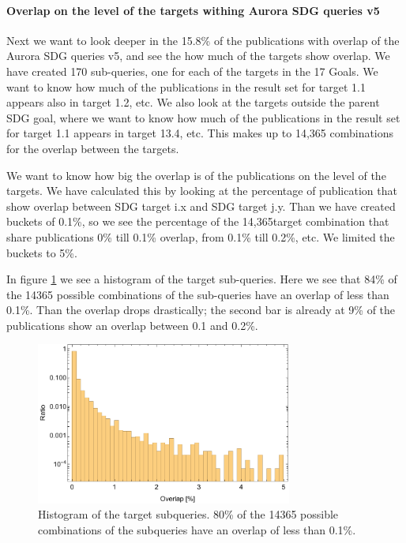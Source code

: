 \documentclass{article}
\begin{document}
\paragraph{Overlap on the level of the targets withing Aurora SDG queries v5}
Next we want to look deeper in the 15.8\% of the publications with overlap of the Aurora SDG queries v5, and see the how much of the targets show overlap. We have created 170 sub-queries, one for each of the targets in the 17 Goals. We want to know how much of the publications in the result set for target 1.1 appears also in target 1.2, etc. We also look at the targets outside the parent SDG goal, where we want to know how much of the publications in the result set for target 1.1 appears in target 13.4, etc. This makes up to 14,365 combinations for the overlap between the targets.

We want to know how big the overlap is of the publications on the level of the targets. We have calculated this by looking at the percentage of publication that show overlap between SDG target i.x and SDG target j.y. Than we have created buckets of 0.1\%, so we see the percentage of the 14,365target combination that share publications  0\% till 0.1\% overlap, from 0.1\% till 0.2\%, etc. We limited the buckets to 5\%.

In figure \ref{subquerieshistogram} we see a histogram of the target sub-queries. Here we see that 84\% of the 14365 possible combinations of the sub-queries have an overlap of less than 0.1\%. Than the overlap drops drastically; the second bar is already at 9\% of the publications show an overlap between 0.1 and 0.2\%.

\begin{figure}[H]
	\centering
  \includegraphics[width=0.75\textwidth]{figures/subqueryhistogram.pdf}
	\caption{Histogram of the target subqueries. 80\% of the 14365 possible combinations of the subqueries have an overlap of less than 0.1\%.}
	\label{subquerieshistogram}
\end{figure}
\end{document}
